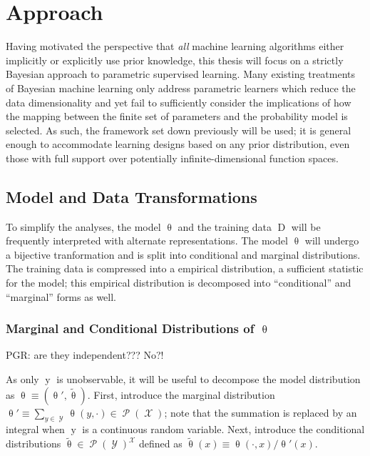 \documentclass[12pt]{article}
\DeclareMathOperator{\yrm}{\mathrm{y}}
\DeclareMathOperator{\Drm}{\mathrm{D}}
\DeclareMathOperator{\Xcal}{\mathcal{X}}
\DeclareMathOperator{\Ycal}{\mathcal{Y}}
\DeclareMathOperator{\Pcal}{\mathcal{P}}
\begin{document}
\newpage
\section{Approach} \label{sec:approach}

Having motivated the perspective that \emph{all} machine learning algorithms either implicitly or explicitly use prior knowledge, this thesis will focus on a strictly Bayesian approach to parametric supervised learning. Many existing treatments of Bayesian machine learning only address parametric learners which reduce the data dimensionality and yet fail to sufficiently consider the implications of how the mapping between the finite set of parameters and the probability model is selected. As such, the  framework set down previously will be used; it is general enough to accommodate learning designs based on any prior distribution, even those with full support over potentially infinite-dimensional function spaces.




\subsection{Model and Data Transformations}

To simplify the analyses, the model $\uptheta$ and the training data $\Drm$ will be frequently interpreted with alternate representations. The model $\uptheta$ will undergo a bijective tranformation and is split into conditional and marginal distributions. The training data is compressed into a empirical distribution, a sufficient statistic for the model; this empirical distribution is decomposed into ``conditional'' and ``marginal'' forms as well.



\subsubsection{Marginal and Conditional Distributions of $\uptheta$}

PGR: are they independent??? No?!

As only $\yrm$ is unobservable, it will be useful to decompose the model distribution as $\uptheta \equiv (\uptheta',\tilde{\uptheta})$. First, introduce the marginal distribution $\uptheta' \equiv \sum_{y \in \Ycal} \uptheta(y,\cdot) \in \Pcal(\Xcal)$; note that the summation is replaced by an integral when $\yrm$ is a continuous random variable. Next, introduce the conditional distributions $\tilde{\uptheta} \in \Pcal(\Ycal)^{\Xcal}$ defined as $\tilde{\uptheta}(x) \equiv \uptheta(\cdot,x) / \uptheta'(x)$. 
\end{document}
